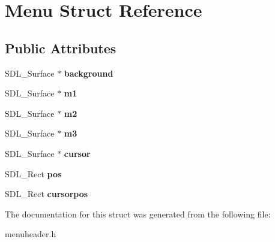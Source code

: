 \hypertarget{structMenu}{}\section{Menu Struct Reference}
\label{structMenu}
\subsection*{Public Attributes}
\begin{DoxyCompactItemize}
\item 
S\+D\+L\+\_\+\+Surface $\ast$ {\bfseries background}\hypertarget{structMenu_a123ec2a645c28a62b7021e64c19fa798}{}\label{structMenu_a123ec2a645c28a62b7021e64c19fa798}

\item 
S\+D\+L\+\_\+\+Surface $\ast$ {\bfseries m1}\hypertarget{structMenu_a1ff236d1bf42835964b3119e0eaf7dd2}{}\label{structMenu_a1ff236d1bf42835964b3119e0eaf7dd2}

\item 
S\+D\+L\+\_\+\+Surface $\ast$ {\bfseries m2}\hypertarget{structMenu_a4bbd4f691703eda66dee3832a7662e86}{}\label{structMenu_a4bbd4f691703eda66dee3832a7662e86}

\item 
S\+D\+L\+\_\+\+Surface $\ast$ {\bfseries m3}\hypertarget{structMenu_a9c2d52461e9e5f088a641acc488d5ee9}{}\label{structMenu_a9c2d52461e9e5f088a641acc488d5ee9}

\item 
S\+D\+L\+\_\+\+Surface $\ast$ {\bfseries cursor}\hypertarget{structMenu_a567e764d16284c9548a0de0ddbfa6c0f}{}\label{structMenu_a567e764d16284c9548a0de0ddbfa6c0f}

\item 
S\+D\+L\+\_\+\+Rect {\bfseries pos}\hypertarget{structMenu_a01d4a3887948b1c4f8448d21874463c1}{}\label{structMenu_a01d4a3887948b1c4f8448d21874463c1}

\item 
S\+D\+L\+\_\+\+Rect {\bfseries cursorpos}\hypertarget{structMenu_ae10c74b05bfd8e85eb793f57855f9e16}{}\label{structMenu_ae10c74b05bfd8e85eb793f57855f9e16}

\end{DoxyCompactItemize}


The documentation for this struct was generated from the following file\+:\begin{DoxyCompactItemize}
\item 
menuheader.\+h\end{DoxyCompactItemize}
